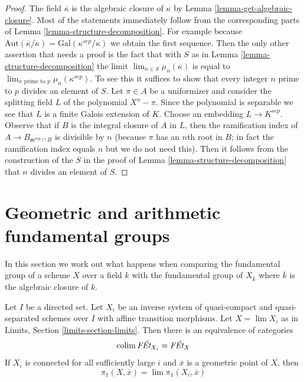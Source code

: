 \begin{proof}
The field $\overline{\kappa}$ is the algebraic closure of $\kappa$ by
Lemma \ref{lemma-get-algebraic-closure}.
Most of the statements immediately follow from the corresponding
parts of Lemma \ref{lemma-structure-decomposition}. For example because
$\text{Aut}(\overline{\kappa}/\kappa) = \text{Gal}(\kappa^{sep}/\kappa)$
we obtain the first sequence.
Then the only other assertion that needs a proof is the fact that
with $S$ as in Lemma \ref{lemma-structure-decomposition} the
limit $\lim_{n \in S} \mu_n(\overline{\kappa})$ is equal to
$\lim_{n\text{ prime to }p} \mu_n(\kappa^{sep})$. To see this
it suffices to show that every integer $n$ prime to $p$
divides an element of $S$.
Let $\pi \in A$ be a uniformizer and consider the splitting
field $L$ of the polynomial $X^n - \pi$. Since the polynomial
is separable we see that $L$ is a finite Galois extension of $K$.
Choose an embedding $L \to K^{sep}$.
Observe that if $B$ is the integral closure of $A$ in $L$,
then the ramification index of $A \to B_{\mathfrak m^{sep} \cap B}$
is divisible by $n$ (because $\pi$ has an $n$th root in $B$; in fact
the ramification index equals $n$ but we do not need this).
Then it follows from the construction of the $S$ in the proof of
Lemma \ref{lemma-structure-decomposition}
that $n$ divides an element of $S$.
\end{proof}








\section{Geometric and arithmetic fundamental groups}
\label{section-galois-action}

\noindent
In this section we work out what happens when comparing the
fundamental group of a scheme $X$ over a field $k$ with the
fundamental group of $X_{\overline{k}}$ where $\overline{k}$
is the algebraic closure of $k$.

\begin{lemma}
\label{lemma-limit}
Let $I$ be a directed set. Let $X_i$ be an
inverse system of quasi-compact and quasi-separated schemes
over $I$ with affine transition morphisms.
Let $X = \lim X_i$ as in Limits, Section \ref{limits-section-limits}.
Then there is an equivalence of categories
$$
\mathop{\mathrm{colim}}\nolimits \textit{F\'Et}_{X_i} = \textit{F\'Et}_X
$$
If $X_i$ is connected for all sufficiently large $i$ and $\overline{x}$
is a geometric point of $X$, then
$$
\pi_1(X, \overline{x}) = \lim \pi_1(X_i, \overline{x})
$$
\end{lemma}

